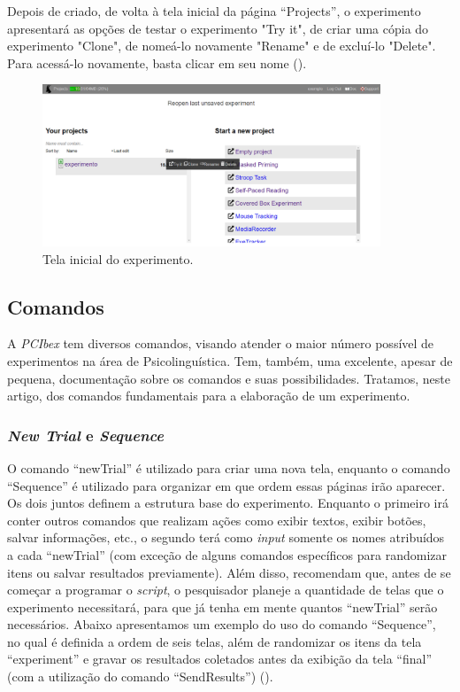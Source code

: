 \documentclass{textolivre}
\begin{document}
Depois de criado, de volta à tela inicial da página “Projects”, o experimento apresentará as opções de testar o experimento "Try it", de criar uma cópia do experimento "Clone", de nomeá-lo novamente "Rename" e de excluí-lo "Delete". Para acessá-lo novamente, basta clicar em seu nome ().

\begin{figure}[htbp]
 \centering
 \includegraphics[width=0.9\textwidth]{fig-008.png}
 \caption{Tela inicial do experimento.}
 \label{fig8}
\end{figure}

\subsection{Comandos}
A \emph{PCIbex} tem diversos comandos, visando atender o maior número possível de experimentos na área de Psicolinguística. Tem, também, uma excelente, apesar de pequena, documentação sobre os comandos e suas possibilidades. Tratamos, neste artigo, dos comandos fundamentais para a elaboração de um experimento.

\subsubsection{\emph{New Trial} e \emph{Sequence}}
O comando “newTrial” é utilizado para criar uma nova tela, enquanto o comando “Sequence” é utilizado para organizar em que ordem essas páginas irão aparecer. Os dois juntos definem a estrutura base do experimento. Enquanto o primeiro irá conter outros comandos que realizam ações como exibir textos, exibir botões, salvar informações, etc., o segundo terá como \emph{input} somente os nomes atribuídos a cada “newTrial” (com exceção de alguns comandos específicos para randomizar itens ou salvar resultados previamente). Além disso, \textcite{zehr2018} recomendam que, antes de se começar a programar o \emph{script}, o pesquisador planeje a quantidade de telas que o experimento necessitará, para que já tenha em mente quantos “newTrial” serão necessários. Abaixo apresentamos um exemplo do uso do comando “Sequence”, no qual é definida a ordem de seis telas, além de randomizar os itens da tela “experiment” e gravar os resultados coletados antes da exibição da tela “final” (com a utilização do comando “SendResults”) ().
\end{document}
